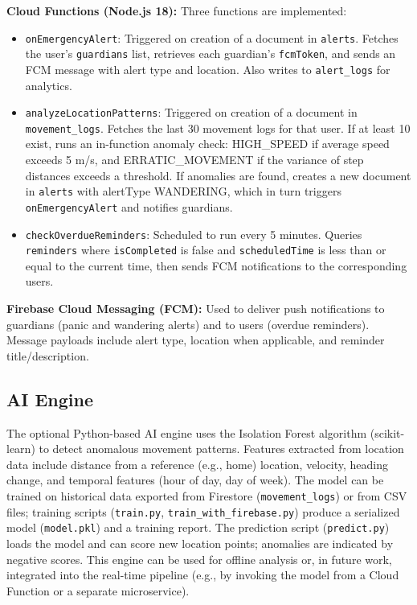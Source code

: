 \documentclass[conference]{IEEEtran}
\begin{document}
\textbf{Cloud Functions (Node.js 18):} Three functions are implemented:
\begin{itemize}
    \item \texttt{onEmergencyAlert}: Triggered on creation of a document in \texttt{alerts}. Fetches the user's \texttt{guardians} list, retrieves each guardian's \texttt{fcmToken}, and sends an FCM message with alert type and location. Also writes to \texttt{alert\_logs} for analytics.
    \item \texttt{analyzeLocationPatterns}: Triggered on creation of a document in \texttt{movement\_logs}. Fetches the last 30 movement logs for that user. If at least 10 exist, runs an in-function anomaly check: HIGH\_SPEED if average speed exceeds 5 m/s, and ERRATIC\_MOVEMENT if the variance of step distances exceeds a threshold. If anomalies are found, creates a new document in \texttt{alerts} with alertType WANDERING, which in turn triggers \texttt{onEmergencyAlert} and notifies guardians.
    \item \texttt{checkOverdueReminders}: Scheduled to run every 5 minutes. Queries \texttt{reminders} where \texttt{isCompleted} is false and \texttt{scheduledTime} is less than or equal to the current time, then sends FCM notifications to the corresponding users.
\end{itemize}

\textbf{Firebase Cloud Messaging (FCM):} Used to deliver push notifications to guardians (panic and wandering alerts) and to users (overdue reminders). Message payloads include alert type, location when applicable, and reminder title/description.

\subsection{AI Engine}

The optional Python-based AI engine uses the Isolation Forest algorithm (scikit-learn) to detect anomalous movement patterns. Features extracted from location data include distance from a reference (e.g., home) location, velocity, heading change, and temporal features (hour of day, day of week). The model can be trained on historical data exported from Firestore (\texttt{movement\_logs}) or from CSV files; training scripts (\texttt{train.py}, \texttt{train\_with\_firebase.py}) produce a serialized model (\texttt{model.pkl}) and a training report. The prediction script (\texttt{predict.py}) loads the model and can score new location points; anomalies are indicated by negative scores. This engine can be used for offline analysis or, in future work, integrated into the real-time pipeline (e.g., by invoking the model from a Cloud Function or a separate microservice).
\end{document}
